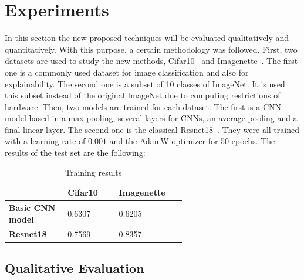 \documentclass[preprint,12pt]{elsarticle}
\begin{document}
\section{Experiments}
\label{sec:experiments}
In this section the new proposed techniques will be evaluated qualitatively and quantitatively. With this purpose, a certain methodology was followed. First, two datasets are used to study the new methods, Cifar10~\cite{CIFAR10CIFAR100Datasets} and Imagenette~\cite{Imagenette2022}. The first one is a commonly used dataset for image classification and also for explainability. The second one is a subset of 10 classes of ImageNet. It is used this subset instead of the original ImageNet due to computing restrictions of hardware. Then, two models are trained for each dataset. The first is a CNN model based in a max-pooling, several layers for CNNs, an average-pooling and a final linear layer. The second one is the classical Resnet18~\cite{heDeepResidualLearning2016}. They were all trained with a learning rate of $0.001$ and the AdamW optimizer for 50 epochs. The results of the test set are the following:

\begin{table}[h!]
    \begin{center}
        \begin{tabular}{|L{0.2\linewidth}|C{0.2\linewidth}|C{0.2\linewidth}|}
            \hline
            \textbf{} & \textbf{Cifar10} & \textbf{Imagenette}\\ \hline
            \textbf{Basic CNN model} & 0.6307 & 0.6205 \\ \hline
            \textbf{Resnet18} & 0.7569 & 0.8357 \\ \hline
        \end{tabular}
        \caption{Training results}
        \label{tab: training results}
    \end{center}
\end{table}

\subsection{Qualitative Evaluation}
\end{document}
